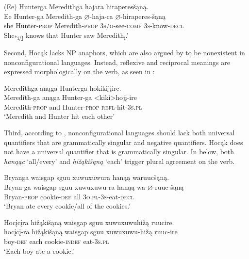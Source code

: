 \documentclass[output=paper]{LSP/langsci}
\begin{document}
\begin{exe}
\ex\label{ex:jrs:17}	
\glll (Ee) 	Hunterga 	Meredithga		hajara 						hiraperes\v{s}ąną. \\
 Ee 		Hunter-ga 	Meredith-ga 		$\varnothing$-haja-ra 				$\varnothing$-hiraperes-\v{s}ąną \\
she 		Hunter-\textsc{prop} 	Meredith-\textsc{prop} 	\textsc{3s/o}-see-\textsc{comp} 	\textsc{3s}-know-\textsc{decl}  \\
\trans She\textsubscript{*i/j} knows that Hunter saw Meredith\textsubscript{i}.'
\end{exe}	

Second, Hocąk lacks NP anaphors, which are also argued by \citet{Baker1996} to be nonexistent in nonconfigurational languages. Instead, reflexive and reciprocal meanings are expressed morphologically on the verb, as seen in :

\begin{exe}
\ex\label{ex:jrs:18} 
\glll Meredithga		anąga 	Hunterga 			hokikij\k{i}ire.\\
Meredith-ga	 	anąga 	Hunter-ga 			<kiki>hoj\k{i}-ire \\
Meredith-\textsc{prop} and 		Hunter-\textsc{prop} 	\textsc{refl}-hit-\textsc{3s.pl} \\
\trans `Meredith and Hunter hit each other'
\end{exe}
	
Third, according to \citet{Baker1996}, nonconfigurational languages should lack both universal quantifiers that are grammatically singular and negative quantifiers. Hocąk does not have a universal quantifier that is grammatically singular.  In  below, both \textit{hanąąc} `all/every' and \textit{hi\v{z}ąki\v{s}ąną} `each' trigger plural agreement on the verb.

\begin{exe}
\ex\label{ex:jrs:19}	
\begin{xlist}	
\ex
\glll Bryanga {waisgap sguu xuwuxuwura} 	hanąą 	waruuc\v{s}ąną.\\
Bryan-ga 	{waisgap sguu xuwuxuwu-ra} 	hanąą 	wa-$\varnothing$-ruuc-\v{s}ąną \\
	Bryan-\textsc{prop} 	cookie-\textsc{def}	all 		\textsc{3o.pl-3s}-eat-\textsc{decl} \\
\trans `Bryan ate every cookie/all of the cookies.'

\ex
\glll Hoc\k{i}c\k{i}ra 	hi\v{z}ąki\v{s}ąną 	{waisgap sguu xuwuxuwuhi\v{z}ą }		ruucire.\\
hoc\k{i}c\k{i}-ra 	hi\v{z}ąki\v{s}ąną 	{waisgap sguu xuwuxuwu-hi\v{z}ą }		ruuc-ire \\
	boy-\textsc{def} 		each 					cookie-\textsc{indef}		eat-\textsc{3s.pl}\\
\trans `Each boy ate a cookie.'
\end{xlist}
\end{exe}
\end{document}
